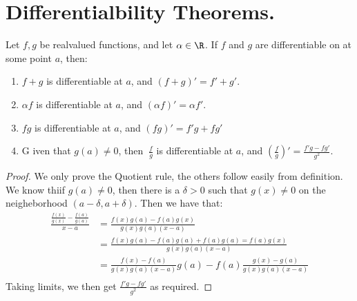 
\section{Differentialbility Theorems.}

\begin{theorem}\label{4.2.1}
    Let $f,g$ be realvalued functions, and let  $\alpha \in \R$. If $f$ and  $g$ are 
    differentiable on  at some point  $a$, then:
         \begin{enumerate}[label=(\arabic*)]
             \item $f+g$ is differentiable at $a$, and $(f+g)'=f'+g'$.

             \item $\alpha f$ is differentiable at $a$, and  $(\alpha f)'=\alpha f'$.

             \item $fg$ is differentiable at $a$, and  $(fg)'=f' g +fg'$

             \item G iven that $g(a) \neq 0$, then $\ \frac{f}{g}$ is differentiable at  $a$,
                 and $( \frac{f}{g})'= \frac{f'g-fg'}{g^2}$.
        \end{enumerate}
\end{theorem}
\begin{proof}
    We only prove the Quotient rule, the others follow easily from definition. We know 
    thi\at if $g(a) \neq 0$, then there is a  $\delta>0$ such that  $g(x) \neq 0$ on the 
    neigheborhood $(a-\delta,a+\delta)$. Then we have that:
        \begin{align*}
            \frac{\frac{f(x)}{g(x)}-\frac{f(a)}{g(a)}}{x-a} &= \frac{f(x)g(a)-f(a)g(x)}
                                                                {g(x)g(a)(x-a)} \\
            &= \frac{f(x)g(a)-f(a)g(a)+f(a)g(a)=f(a)g(x)}{g(x)g(a)(x-a)} \\
            &= \frac{f(x)-f(a)}{g(x)g(a)(x-a)}g(a)-f(a)\frac{g(x)-g(a)}{g(x)g(a)(x-a)} \\
        \end{align*}
    Taking limits, we then get $\frac{f'g-fg'}{g^2}$ as required.
\end{proof}

